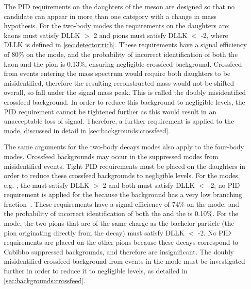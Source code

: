 The PID requirements on the daughters of the \Dz meson are designed so that no  candidate can appear in more than one category with a change in mass hypothesis. For the two-body \Dz modes the requirements on the \Dz daughters are: kaons must satisfy DLLK $>$ 2 and pions must satisfy DLLK $<$ -2, where DLLK is defined in \sect\ref{sec:detector:rich}. These requirements have a signal efficiency of 80\% on the \kpi mode, and the probability of incorrect identification of both the kaon and the pion is 0.13\%, ensuring negligible crossfeed background. Crossfeed from \kpi events entering the \pik mass spectrum would require both \Dz daughters to be misidentified, therefore the resulting reconstructed \Dz mass would not be shifted overall, so fall under the signal \Dz mass peak. This is called the doubly misidentified crossfeed background. In order to reduce this background to negligible levels, the PID requirement cannot be tightened further as this would result in an unacceptable loss of signal. Therefore, a further requirement is applied to the \pik mode, discussed in detail in \sect\ref{sec:backgrounds:crossfeed}.

The same arguments for the two-body \Dz decays modes also apply to the four-body modes. Crossfeed backgrounds may occur in the suppressed \Dz modes from misidentified \kpipipi events. Tight PID requirements must be placed on the \Dz daughters in order to reduce these crossfeed backgrounds to negligible levels. For the \decay{\Dz}{\Kmp\pipm\pimp\pipm} modes, e.g. \decay{\Dz}{\Km\pip\pim\pip}, the \Km must satisfy DLLK $>$ 2 and both \pip must satisfy DLLK $<$ -2; no PID requirement is applied for the \pim because the background \decay{\Dz}{\Kp\Km\Kp\pim} has a very low branching fraction~\cite{PDG2016}. These requirements have a signal efficiency of 74\% on the \kpipipi mode, and the probability of incorrect identification of both the \Km and the \pip is 0.10\%. For the \decay{\Dz}{\pip\pim\pip\pim} mode, the two pions that are of the same charge as the bachelor particle (the pion originating directly from the \Kstarm decay) must satisfy DLLK $<$ -2. No PID requirements are placed on the other pions because these decays correspond to Cabibbo suppressed backgrounds, and therefore are insignificant. The doubly misidentified crossfeed background from \kpipipi events in the \pikpipi mode must be investigated further in order to reduce it to negligible levels, as detailed in \sect\ref{sec:backgrounds:crossfeed}.

